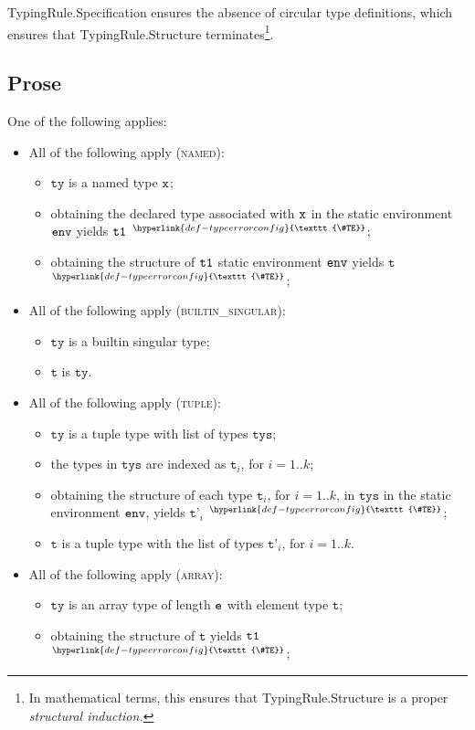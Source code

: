 \documentclass{book}
\newcommand\TypeErrorConfig[0]{\hyperlink{def-typeerrorconfig}{\texttt{\#TE}}}
\newcommand\ProseOrTypeError[0]{\hyperlink{def-proseortypeerror}{$^{\TypeErrorConfig}$}}
\newcommand\vt[0]{\texttt{t}}
\newcommand\tty[0]{\texttt{ty}}
\newcommand\vtp[0]{\texttt{t'}}
\newcommand\tys[0]{\texttt{tys}}
\begin{document}
TypingRule.Specification ensures the absence of circular type definitions,
which ensures that TypingRule.Structure terminates\footnote{In mathematical terms,
this ensures that TypingRule.Structure is a proper \emph{structural induction.}}.

\subsection{Prose}
One of the following applies:
\begin{itemize}
\item All of the following apply (\textsc{named}):
  \begin{itemize}
  \item $\tty$ is a named type $\texttt{x}$;
  \item obtaining the declared type associated with $\texttt{x}$ in the static environment $\texttt{env}$ yields $\texttt{t1}$ \ProseOrTypeError;
  \item obtaining the structure of $\texttt{t1}$ static environment $\texttt{env}$ yields $\vt$ \ProseOrTypeError;
  \end{itemize}
\item All of the following apply (\textsc{builtin\_singular}):
  \begin{itemize}
  \item $\tty$ is a builtin singular type;
  \item $\vt$ is $\tty$.
  \end{itemize}
\item All of the following apply (\textsc{tuple}):
  \begin{itemize}
  \item $\tty$ is a tuple type with list of types $\tys$;
  \item the types in $\tys$ are indexed as $\vt_i$, for $i=1..k$;
  \item obtaining the structure of each type $\vt_i$, for $i=1..k$, in $\tys$ in the static environment $\texttt{env}$,
  yields $\vtp_i$ \ProseOrTypeError;
  \item $\vt$ is a tuple type with the list of types $\vtp_i$, for $i=1..k$.
  \end{itemize}
\item All of the following apply (\textsc{array}):
  \begin{itemize}
    \item $\tty$ is an array type of length $\texttt{e}$ with element type $\vt$;
    \item obtaining the structure of $\vt$ yields $\texttt{t1}$ \ProseOrTypeError;

\end{itemize}
\end{itemize}
\end{document}
